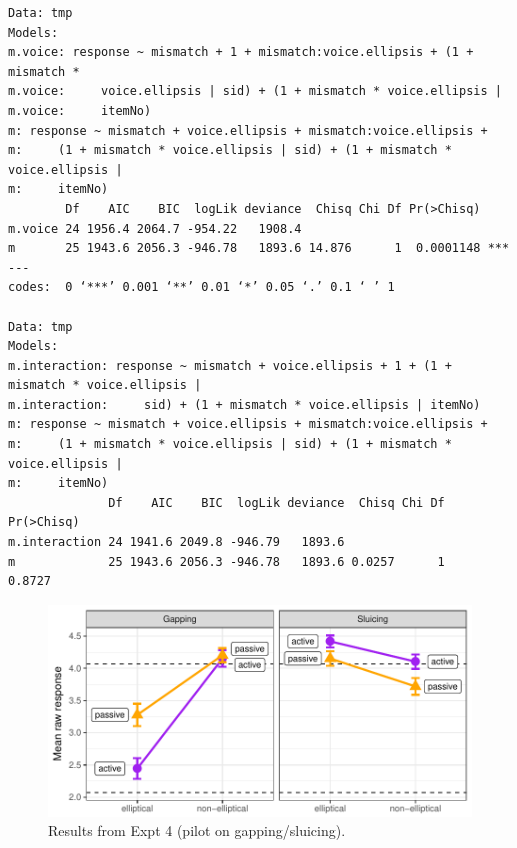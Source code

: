 \documentclass[11pt]{article}
\begin{document}
\begin{verbatim}
Data: tmp
Models:
m.voice: response ~ mismatch + 1 + mismatch:voice.ellipsis + (1 + mismatch * 
m.voice:     voice.ellipsis | sid) + (1 + mismatch * voice.ellipsis | 
m.voice:     itemNo)
m: response ~ mismatch + voice.ellipsis + mismatch:voice.ellipsis + 
m:     (1 + mismatch * voice.ellipsis | sid) + (1 + mismatch * voice.ellipsis | 
m:     itemNo)
        Df    AIC    BIC  logLik deviance  Chisq Chi Df Pr(>Chisq)    
m.voice 24 1956.4 2064.7 -954.22   1908.4                             
m       25 1943.6 2056.3 -946.78   1893.6 14.876      1  0.0001148 ***
---
codes:  0 ‘***’ 0.001 ‘**’ 0.01 ‘*’ 0.05 ‘.’ 0.1 ‘ ’ 1

Data: tmp
Models:
m.interaction: response ~ mismatch + voice.ellipsis + 1 + (1 + mismatch * voice.ellipsis | 
m.interaction:     sid) + (1 + mismatch * voice.ellipsis | itemNo)
m: response ~ mismatch + voice.ellipsis + mismatch:voice.ellipsis + 
m:     (1 + mismatch * voice.ellipsis | sid) + (1 + mismatch * voice.ellipsis | 
m:     itemNo)
              Df    AIC    BIC  logLik deviance  Chisq Chi Df Pr(>Chisq)
m.interaction 24 1941.6 2049.8 -946.79   1893.6                         
m             25 1943.6 2056.3 -946.78   1893.6 0.0257      1     0.8727
\end{verbatim}

\begin{figure}[htbp]
\centering
\includegraphics[width=.9\linewidth]{img/expt-04-graph.pdf}
\caption{Results from Expt 4 (pilot on gapping/sluicing).}
\end{figure}
\end{document}
